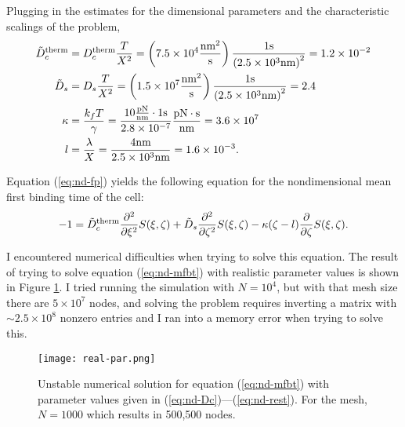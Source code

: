 \documentclass{article}
\newcommand{\tn}{\textnormal}
\newcommand{\Pder}[2]{\frac{\partial #1}{\partial #2}}
\begin{document}
Plugging in the estimates for the dimensional parameters and the
characteristic scalings of the problem,
\begin{align}
  \label{eq:nd-Dc}
  \tilde{D}_c^\tn{therm} &= D_c^\tn{therm} \frac{T}{X^2} = \left(7.5
                           \times 10^4 \frac{\tn{nm}^2}{\tn{s}}\right)
                           \frac{1\tn{s}}{\left(2.5 \times 10^3
                           \tn{nm}\right)^2} = 1.2 \times 10^{-2} \\
  \label{eq:nd-Ds}
  \tilde{D}_s &= D_s \frac{T}{X^2} = \left(1.5 \times 10^7
                \frac{\tn{nm}^2}{\tn{s}}\right)
                \frac{1\tn{s}}{\left(2.5 \times 10^3 \tn{nm}\right)^2}
                = 2.4 \\
  \label{eq:nd-kappa}
  \kappa &= \frac{k_f T}{\gamma} = \frac{10 \frac{\tn{pN}}{\tn{nm}}
           \cdot 1\tn{s}}{2.8 \times 10^{-7}}
           \frac{\tn{pN}\cdot\tn{s}}{\tn{nm}} = 3.6 \times 10^7 \\
  \label{eq:nd-rest}
  l &= \frac{\lambda}{X} = \frac{4 \tn{nm}}{2.5 \times 10^3 \tn{nm}} =
      1.6 \times 10^{-3}. 
\end{align}

Equation (\ref{eq:nd-fp}) yields the following equation for the
nondimensional mean first binding time of the cell:
\begin{equation}
  \label{eq:nd-mfbt}
  -1 = \tilde{D}_c^\tn{therm} \frac{\partial^2}{\partial \xi^2} S(\xi,
  \zeta) + \tilde{D}_s \frac{\partial^2}{\partial \zeta^2} S(\xi,
  \zeta) - \kappa (\zeta - l) \Pder{}{\zeta} S(\xi, \zeta).
\end{equation}

I encountered numerical difficulties when trying to solve this
equation. The result of trying to solve equation (\ref{eq:nd-mfbt})
with realistic parameter values is shown in Figure
\ref{fig:real-par}. I tried running the simulation with $N = 10^4$,
but with that mesh size there are $5 \times 10^7$ nodes, and solving
the problem requires inverting a matrix with $\sim 2.5 \times 10^8$
nonzero entries and I ran into a memory error when trying to solve
this. 

\begin{figure}
  \centering
  \texttt{[image: real-par.png]}
  \caption{Unstable numerical solution for equation (\ref{eq:nd-mfbt})
  with parameter values given in
  (\ref{eq:nd-Dc})---(\ref{eq:nd-rest}). For the mesh, $N = 1000$
  which results in 500,500 nodes.}
  \label{fig:real-par}
\end{figure}
\end{document}
